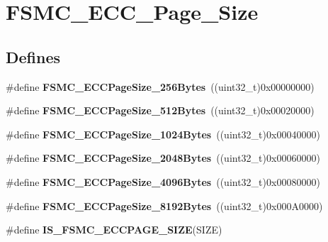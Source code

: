 \hypertarget{group__FSMC__ECC__Page__Size}{
\section{FSMC\_\-ECC\_\-Page\_\-Size}
\label{group__FSMC__ECC__Page__Size}
}
\subsection*{Defines}
\begin{DoxyCompactItemize}
\item 
\hypertarget{group__FSMC__ECC__Page__Size_gaaa1661267b44e6728fa64aca79de54b3}{
\#define {\bfseries FSMC\_\-ECCPageSize\_\-256Bytes}~((uint32\_\-t)0x00000000)}
\label{group__FSMC__ECC__Page__Size_gaaa1661267b44e6728fa64aca79de54b3}

\item 
\hypertarget{group__FSMC__ECC__Page__Size_gacb4da17c28dde89e38ff4ed40497f6b5}{
\#define {\bfseries FSMC\_\-ECCPageSize\_\-512Bytes}~((uint32\_\-t)0x00020000)}
\label{group__FSMC__ECC__Page__Size_gacb4da17c28dde89e38ff4ed40497f6b5}

\item 
\hypertarget{group__FSMC__ECC__Page__Size_ga8137931c96b63ec7e6f80a8c7391433f}{
\#define {\bfseries FSMC\_\-ECCPageSize\_\-1024Bytes}~((uint32\_\-t)0x00040000)}
\label{group__FSMC__ECC__Page__Size_ga8137931c96b63ec7e6f80a8c7391433f}

\item 
\hypertarget{group__FSMC__ECC__Page__Size_gab8f3ae95becd59e71a976b97ded904b8}{
\#define {\bfseries FSMC\_\-ECCPageSize\_\-2048Bytes}~((uint32\_\-t)0x00060000)}
\label{group__FSMC__ECC__Page__Size_gab8f3ae95becd59e71a976b97ded904b8}

\item 
\hypertarget{group__FSMC__ECC__Page__Size_gaec2e9e434685a1756bd171699248f65a}{
\#define {\bfseries FSMC\_\-ECCPageSize\_\-4096Bytes}~((uint32\_\-t)0x00080000)}
\label{group__FSMC__ECC__Page__Size_gaec2e9e434685a1756bd171699248f65a}

\item 
\hypertarget{group__FSMC__ECC__Page__Size_gab6877a99ddf02e7aa95cf04896ce731d}{
\#define {\bfseries FSMC\_\-ECCPageSize\_\-8192Bytes}~((uint32\_\-t)0x000A0000)}
\label{group__FSMC__ECC__Page__Size_gab6877a99ddf02e7aa95cf04896ce731d}

\item 
\#define {\bfseries IS\_\-FSMC\_\-ECCPAGE\_\-SIZE}(SIZE)
\end{DoxyCompactItemize}


